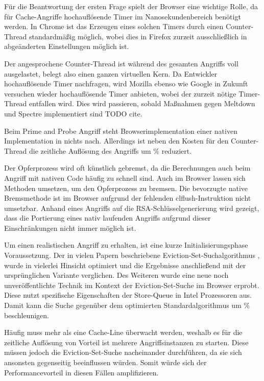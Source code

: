 Für die Beantwortung der ersten Frage spielt der Browser eine wichtige Rolle, da für Cache-Angriffe hochauflösende Timer im Nanosekundenbereich benötigt werden.
In Chrome ist das Erzeugen eines solchen Timers durch einen Counter-Thread standardmäßig möglich, wobei dies in Firefox zurzeit ausschließlich in abgeänderten Einstellungen möglich ist.

Der angesprochene Counter-Thread ist während des gesamten Angriffs voll ausgelastet, belegt also einen ganzen virtuellen Kern.
Da Entwickler hochauflösende Timer nachfragen, wird Mozilla ebenso wie Google in Zukunft versuchen wieder hochauflösende Timer anbieten, wobei der zurzeit nötige Timer-Thread entfallen wird.
Dies wird passieren, sobald Maßnahmen gegen Meltdown und Spectre implementiert sind TODO cite.

\par\medskip

Beim Prime and Probe Angriff steht Browserimplementation einer nativen Implementation in nichts nach. Allerdings ist neben den Kosten für den Counter-Thread die zeitliche Auflösung des Angriffs um  \% reduziert.

Der Opferprozess wird oft künstlich gebremst, da die Berechnungen auch beim Angriff mit nativen Code häufig zu schnell sind.
Auch im Browser lassen sich Methoden umsetzen, um den Opferprozess zu bremsen. 
Die bevorzugte native Bremsmethode ist im Browser aufgrund der fehlenden clflush-Instruktion nicht umsetzbar.
Anhand eines Angriffs auf die RSA-Schlüsselgenerierung wird gezeigt, dass die Portierung eines nativ laufenden Angriffs aufgrund dieser Einschränkungen nicht immer möglich ist.

\par\medskip

Um einen realistischen Angriff zu erhalten, ist eine kurze Initialisierungsphase Voraussetzung.
Der in vielen Papern beschriebene Eviction-Set-Suchalgorithmus \cite{PrimeAndAbort, LiuPrimeAndProbe, DriveByPaper}, wurde in vielerlei Hinsicht optimiert und die Ergebnisse anschließend mit der ursprünglichen Variante verglichen. 
Des Weiteren wurde eine neue noch unveröffentlichte Technik im Kontext der Eviction-Set-Suche im Browser erprobt.
Diese nutzt spezifische Eigenschaften der Store-Queue in Intel Prozessoren aus.
Damit kann die Suche gegenüber dem optimierten Standardalgorithmus um  \% beschleunigen.

Häufig muss mehr als eine Cache-Line überwacht werden, weshalb es für die zeitliche Auflösung von Vorteil ist mehrere Angriffsinstanzen zu starten.
Diese müssen jedoch die Eviction-Set-Suche nacheinander durchführen, da sie sich ansonsten gegenseitig beeinflussen würden.
Somit würde sich der Performancevorteil in diesen Fällen amplifizieren.

